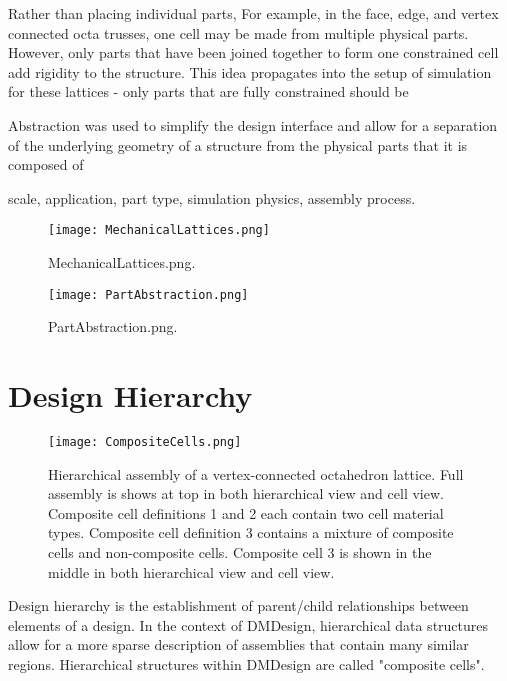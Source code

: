 {Rather than placing individual parts, 
For example, in the face, edge, and vertex connected octa trusses, one cell may be made from multiple physical parts.  However, only parts that have been joined together to form one constrained cell add rigidity to the structure.  This idea propagates into the setup of simulation for these lattices - only parts that are fully constrained should be

Abstraction was used to simplify the design interface and allow for a separation of the underlying geometry of a structure from the physical parts that it is composed of

scale, application, part type, simulation physics, assembly process.

\begin{figure}
  \texttt{[image: MechanicalLattices.png]}
  \caption{MechanicalLattices.png.}
  \label{fig:MechanicalLattices}
\end{figure}

\begin{figure}
  \texttt{[image: PartAbstraction.png]}
  \caption{PartAbstraction.png.}
  \label{fig:PartAbstraction}
\end{figure}


\section{Design Hierarchy}

\begin{figure}
  \texttt{[image: CompositeCells.png]}
  \caption{Hierarchical assembly of a vertex-connected octahedron lattice.  Full assembly is shows at top in both hierarchical view and cell view.  Composite cell definitions 1 and 2 each contain two cell material types.  Composite cell definition 3 contains a mixture of composite cells and non-composite cells.  Composite cell 3 is shown in the middle in both hierarchical view and cell view.}
  \label{fig:CompositeCells}
\end{figure}

Design hierarchy is the establishment of parent/child relationships between elements of a design.  In the context of DMDesign, hierarchical data structures allow for a more sparse description of assemblies that contain many similar regions.  Hierarchical structures within DMDesign are called "composite cells".\\

}
